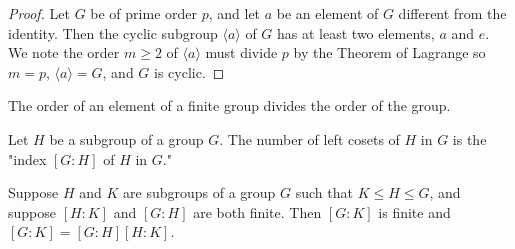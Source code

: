 \documentclass[a4paper,11pt]{article}
\begin{document}
\begin{outline}
    \begin{proof}
      Let \(G\) be of prime order \(p\), and let \(a\) be an element of \(G\) different from the identity. Then
      the cyclic subgroup \(\langle a \rangle\) of \(G\) has at least two elements, \(a\) and \(e\). We note the
      order \(m \geq 2\) of \(\langle a \rangle\) must divide \(p\) by the Theorem of Lagrange so \(m = p\), 
      \(\langle a \rangle = G\), and \(G\) is cyclic.
    \end{proof}
    
    The order of an element of a finite group divides the order of the group.
    
    Let \(H\) be a subgroup of a group \(G\). The number of left cosets of \(H\) in \(G\)
    is the "index \([G:H]\) of \(H\) in \(G\)."
    
    Suppose \(H\) and \(K\) are subgroups of a group \(G\) such that \(K \leq H \leq G\), and suppose \([H:K]\) 
    and \([G:H]\) are both finite. Then \([G:K]\) is finite and \([G:K] = [G:H][H:K]\).

\end{outline}
\end{document}
